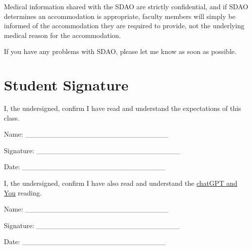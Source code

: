 \documentclass[12pt]{article}
\begin{document}
Medical information shared with the SDAO are strictly confidential, and if SDAO determines an accommodation is appropriate, faculty members will simply be informed of the accommodation they are required to provide, not the underlying medical reason for the accommodation.

If you have any problems with SDAO, please let me know as soon as possible.

\section{Student Signature}

I, the undersigned, confirm I have read and understand the expectations of this class.
\\
\vspace{1cm}

Name: \_\_\_\_\_\_\_\_\_\_\_\_\_\_\_\_\_\_\_\_\_\_\_\_\_\_\_\_
\\
\vspace{1cm}

Signature: \_\_\_\_\_\_\_\_\_\_\_\_\_\_\_\_\_\_\_\_\_\_\_\_\_\_\_\_
\\
\vspace{1cm}

Date: \_\_\_\_\_\_\_\_\_\_\_\_\_\_\_\_\_\_\_\_\_\_\_\_\_\_\_\_

\vspace{2cm}


I, the undersigned, confirm I have also read and understand the \href{https://nickeubank.github.io/practicaldatascience_book/notebooks/PDS_not_yet_in_coursera/99_advice/llms.html}{chatGPT and You} reading.
\\
\vspace{1cm}

Name: \_\_\_\_\_\_\_\_\_\_\_\_\_\_\_\_\_\_\_\_\_\_\_\_\_\_\_\_
\\
\vspace{1cm}

Signature: \_\_\_\_\_\_\_\_\_\_\_\_\_\_\_\_\_\_\_\_\_\_\_\_\_\_\_\_
\\
\vspace{1cm}

Date: \_\_\_\_\_\_\_\_\_\_\_\_\_\_\_\_\_\_\_\_\_\_\_\_\_\_\_\_
\end{document}
